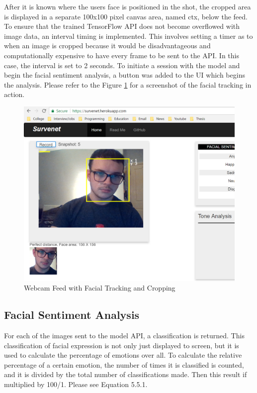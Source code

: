 After it is known where the users face is positioned in the shot, the cropped area is displayed in a separate 100x100 pixel canvas area, named ctx, below the feed. To ensure that the trained TensorFlow API does not become overflowed with image data, an interval timing is implemented. This involves setting a timer as to when an image is cropped because it would be disadvantageous and computationally expensive to have every frame to be sent to the API. In this case, the interval is set to 2 seconds. To initiate a session with the model and begin the facial sentiment analysis, a button was added to the UI which begins the analysis. Please refer to the Figure \ref{web} for a screenshot of the facial tracking in action.

\begin{figure}[ht]
	\begin{center}
		\advance\leftskip-3cm
		\advance\rightskip-3cm
		\includegraphics[keepaspectratio=true,scale=0.5]{__resources/implementation/webapp1.png}
		\caption{Webcam Feed with Facial Tracking and Cropping}
		\label{web}
	\end{center}
\end{figure}

\newpage

\subsection{Facial Sentiment Analysis} 

For each of the images sent to the model API, a classification is returned. This classification of facial expression is not only just displayed to screen, but it is used to calculate the percentage of emotions over all. To calculate the relative percentage of a certain emotion, the number of times it is classified is counted, and it is divided by the total number of classifications made. Then this result if multiplied by 100/1. Please see Equation 5.5.1.

